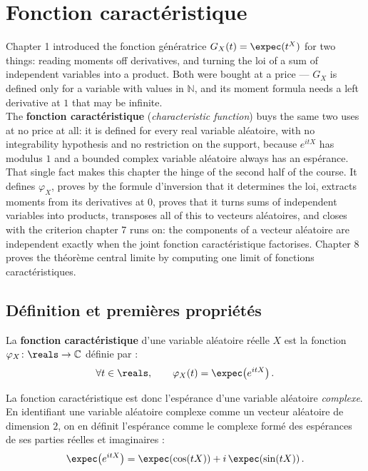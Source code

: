 \section{Fonction caractéristique}

Chapter 1 introduced the fonction génératrice
$G_{X}(t) = \expec(t^{X})$ for two things: reading moments off derivatives, and turning the
loi of a sum of independent variables into a product. Both were bought at a price --- $G_{X}$
is defined only for a variable with values in $\mathbb{N}$, and its moment formula needs a
left derivative at $1$ that may be infinite.\\

The \textbf{fonction caractéristique} (\textit{characteristic function}) buys the same two
uses at no price at all: it is defined for every real variable aléatoire, with no integrability
hypothesis and no restriction on the support, because $e^{itX}$ has modulus $1$ and a
bounded complex variable aléatoire always has an espérance. That single fact makes this
chapter the hinge of the second half of the course. It defines $\varphi_{X}$, proves by the
formule d'inversion that it determines the loi, extracts
moments from its derivatives at $0$,
proves that it turns sums of independent variables into products, transposes all of this to
vecteurs aléatoires, and closes with the criterion chapter 7 runs on: the components of a
vecteur aléatoire are independent exactly when the joint fonction caractéristique factorises.
Chapter 8 proves the théorème central limite by computing one limit of fonctions caractéristiques.

\subsection{Définition et premières propriétés}

\begin{definition}
La \textbf{fonction caractéristique} d'une variable aléatoire réelle $X$ est la fonction
$\varphi_{X} \colon \reals \to \mathbb{C}$ définie par :
\[
  \forall t \in \reals, \qquad \varphi_{X}(t) = \expec\!\left(e^{itX}\right).
\]
\end{definition}

La fonction caractéristique est donc l'espérance d'une variable aléatoire \emph{complexe}.
En identifiant une variable aléatoire complexe comme un vecteur aléatoire de dimension $2$, on
en définit l'espérance comme le complexe formé des espérances de ses parties réelles et
imaginaires :
\[
  \expec\!\left(e^{itX}\right) = \expec\!\left(\cos(tX)\right) +
  i\,\expec\!\left(\sin(tX)\right).
\]

